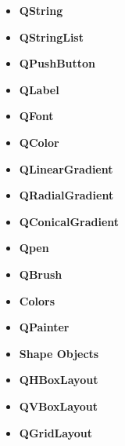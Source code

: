 \documentclass{report}
\begin{document}
    \pagebreak 
    \begin{itemize}
        \item \textbf{QString}
        \item \textbf{QStringList}
        \item \textbf{QPushButton}
        \item \textbf{QLabel}
        \item \textbf{QFont}
        \item \textbf{QColor}
        \item \textbf{QLinearGradient}
        \item \textbf{QRadialGradient}
        \item \textbf{QConicalGradient}
        \item \textbf{Qpen}
        \item \textbf{QBrush}
        \item \textbf{Colors}
        \item \textbf{QPainter}
        \item \textbf{Shape Objects}
        \item \textbf{QHBoxLayout}
        \item \textbf{QVBoxLayout}
        \item \textbf{QGridLayout}
    \end{itemize}
\end{document}
